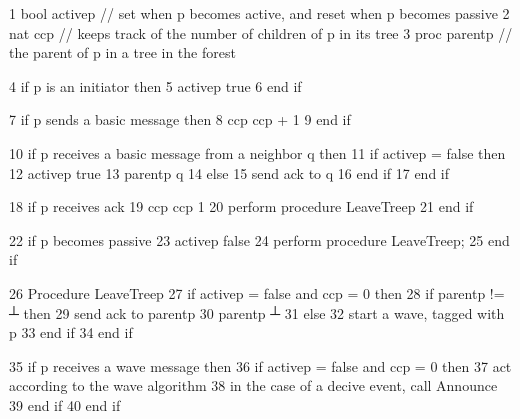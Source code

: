 \documentclass[letterpaper,10pt,english]{sphinxmanual}
\begin{document}
\def\sphinxLiteralBlockLabel{\label{\detokenize{docs/ShavitFrancez/algorithm:id12}}\label{\detokenize{docs/ShavitFrancez/algorithm:shavitfrancezterminationdetectionalgorithm}}}
\begin{sphinxVerbatim}[commandchars=\\\{\},numbers=left,firstnumber=1,stepnumber=1]
1   bool active\PYGZlt{}p\PYGZgt{} // set when p becomes active, and reset when p becomes passive
2   nat cc\PYGZlt{}p\PYGZgt{} // keeps track of the number of children of p in its tree
3   proc parent\PYGZlt{}p\PYGZgt{} // the parent of p in a tree in the forest

4   if p is an initiator then
5       active\PYGZlt{}p\PYGZgt{} \PYGZlt{}\PYGZhy{} true
6   end if

7   if p sends a basic message then
8       cc\PYGZlt{}p\PYGZgt{} \PYGZlt{}\PYGZhy{} cc\PYGZlt{}p\PYGZgt{} + 1
9   end if

10  if p receives a basic message from a neighbor q then
11    if active\PYGZlt{}p\PYGZgt{} = false then
12        active\PYGZlt{}p\PYGZgt{} \PYGZlt{}\PYGZhy{} true
13        parent\PYGZlt{}p\PYGZgt{} \PYGZlt{}\PYGZhy{} q
14    else
15        send \PYGZlt{}ack\PYGZgt{} to q
16    end if
17  end if

18  if p receives \PYGZlt{}ack\PYGZgt{}
19      cc\PYGZlt{}p\PYGZgt{} \PYGZlt{}\PYGZhy{} cc\PYGZlt{}p\PYGZgt{} \PYGZhy{} 1
20      perform procedure LeaveTree\PYGZlt{}p\PYGZgt{}
21  end if

22  if p becomes passive
23      active\PYGZlt{}p\PYGZgt{} \PYGZlt{}\PYGZhy{} false
24      perform procedure LeaveTree\PYGZlt{}p\PYGZgt{};
25  end if

26  Procedure LeaveTree\PYGZlt{}p\PYGZgt{}
27      if active\PYGZlt{}p\PYGZgt{} = false and cc\PYGZlt{}p\PYGZgt{} = 0 then
28          if parent\PYGZlt{}p\PYGZgt{} != ┴ then
29              send \PYGZlt{}ack\PYGZgt{} to parent\PYGZlt{}p\PYGZgt{}
30              parent\PYGZlt{}p\PYGZgt{} \PYGZlt{}\PYGZhy{} ┴
31          else
32              start a wave, tagged with p
33          end if
34      end if

35  if p receives a wave message then
36      if active\PYGZlt{}p\PYGZgt{} = false and cc\PYGZlt{}p\PYGZgt{} = 0 then
37          act according to the wave algorithm
38          in the case of a decive event, call Announce
39      end if
40  end if
\end{sphinxVerbatim}
\end{document}

